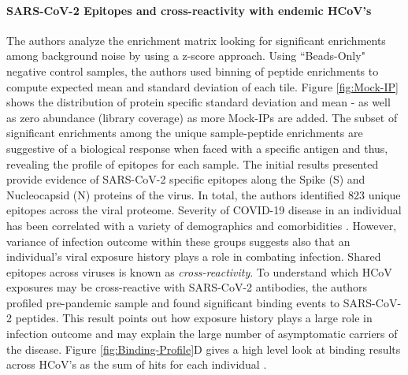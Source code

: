 \documentclass{article}
\begin{document}
\paragraph{SARS-CoV-2 Epitopes and cross-reactivity with endemic HCoV's}
The authors analyze the enrichment matrix looking for significant enrichments among background noise by using a z-score approach.
Using ``Beads-Only" negative control samples, the authors used binning of peptide enrichments to compute expected mean and standard deviation of each tile.
Figure \ref{fig:Mock-IP} shows the distribution of protein specific standard deviation and mean - as well as zero abundance (library coverage) as more Mock-IPs are added.
The subset of significant enrichments among the unique sample-peptide enrichments are suggestive of a biological response when faced with a specific antigen and thus, revealing the profile of epitopes for each sample.
The initial results presented provide evidence of SARS-CoV-2 specific epitopes along the Spike (S) and Nucleocapsid (N) proteins of the virus.
In total, the authors identified 823 unique epitopes across the viral proteome.
Severity of COVID-19 disease in an individual has been correlated with a variety of demographics and comorbidities \citep{Yuki2020}.
However, variance of infection outcome within these groups suggests also that an individual's viral exposure history plays a role in combating infection.
Shared epitopes across viruses is known as \textit{cross-reactivity}.
To understand which HCoV exposures may be cross-reactive with SARS-CoV-2 antibodies, the authors profiled pre-pandemic sample and found significant binding events to SARS-CoV-2 peptides.
This result points out how exposure history plays a large role in infection outcome and may explain the large number of asymptomatic carriers of the disease. 
Figure \ref{fig:Binding-Profile}D gives a high level look at binding results across HCoV's as the sum of hits for each individual \citep{Shrock2020}.
\end{document}
